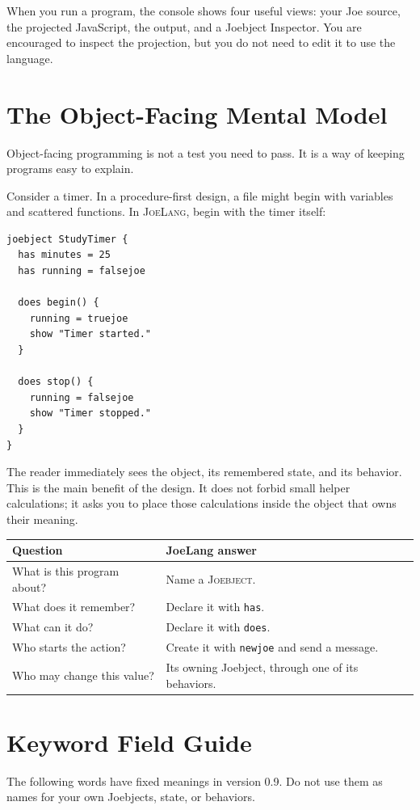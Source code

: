 \documentclass[12pt]{article}
\newcommand{\JoeLang}{\textsc{JoeLang}}
\newcommand{\Joebject}{\textsc{Joebject}}
\newcommand{\kw}[1]{\texttt{#1}}
\begin{document}
When you run a program, the console shows four useful views: your Joe source, the projected JavaScript, the output, and a Joebject Inspector. You are encouraged to inspect the projection, but you do not need to edit it to use the language.

\clearpage
\section{The Object-Facing Mental Model}
Object-facing programming is not a test you need to pass. It is a way of keeping programs easy to explain.

Consider a timer. In a procedure-first design, a file might begin with variables and scattered functions. In \JoeLang, begin with the timer itself:

\begin{lstlisting}[style=joe]
joebject StudyTimer {
  has minutes = 25
  has running = falsejoe

  does begin() {
    running = truejoe
    show "Timer started."
  }

  does stop() {
    running = falsejoe
    show "Timer stopped."
  }
}
\end{lstlisting}

The reader immediately sees the object, its remembered state, and its behavior. This is the main benefit of the design. It does not forbid small helper calculations; it asks you to place those calculations inside the object that owns their meaning.

\begin{longtable}{p{}p{}}
\toprule
\textbf{Question} & \textbf{JoeLang answer}\\
\midrule
What is this program about? & Name a \Joebject.\\
What does it remember? & Declare it with \kw{has}.\\
What can it do? & Declare it with \kw{does}.\\
Who starts the action? & Create it with \kw{newjoe} and send a message.\\
Who may change this value? & Its owning Joebject, through one of its behaviors.\\
\bottomrule
\end{longtable}

\clearpage
\section{Keyword Field Guide}
The following words have fixed meanings in version 0.9. Do not use them as names for your own Joebjects, state, or behaviors.
\end{document}
